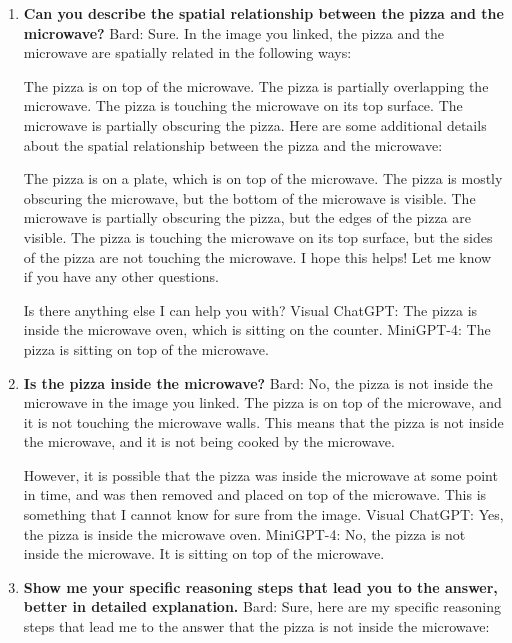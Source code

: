     \begin{enumerate}
        \item \textbf{Can you describe the spatial relationship between the pizza and the microwave?}
        \subitem Bard: 
        Sure. In the image you linked, the pizza and the microwave are spatially related in the following ways:
        
        The pizza is on top of the microwave.
        The pizza is partially overlapping the microwave.
        The pizza is touching the microwave on its top surface.
        The microwave is partially obscuring the pizza.
        Here are some additional details about the spatial relationship between the pizza and the microwave:
        
        The pizza is on a plate, which is on top of the microwave.
        The pizza is mostly obscuring the microwave, but the bottom of the microwave is visible.
        The microwave is partially obscuring the pizza, but the edges of the pizza are visible.
        The pizza is touching the microwave on its top surface, but the sides of the pizza are not touching the microwave.
        I hope this helps! Let me know if you have any other questions.
        
        Is there anything else I can help you with?
        \subitem Visual ChatGPT: The pizza is inside the microwave oven, which is sitting on the counter.
        \subitem MiniGPT-4: The pizza is sitting on top of the microwave.
        \item \textbf{Is the pizza inside the microwave?}
        \subitem Bard: 
        No, the pizza is not inside the microwave in the image you linked. The pizza is on top of the microwave, and it is not touching the microwave walls. This means that the pizza is not inside the microwave, and it is not being cooked by the microwave.
        
        However, it is possible that the pizza was inside the microwave at some point in time, and was then removed and placed on top of the microwave. This is something that I cannot know for sure from the image.
        \subitem Visual ChatGPT: Yes, the pizza is inside the microwave oven.
        \subitem MiniGPT-4: No, the pizza is not inside the microwave. It is sitting on top of the microwave.
        \item \textbf{Show me your specific reasoning steps that lead you to the answer, better in detailed explanation.}
        \subitem Bard: 
        Sure, here are my specific reasoning steps that lead me to the answer that the pizza is not inside the microwave:
        

\end{enumerate}
